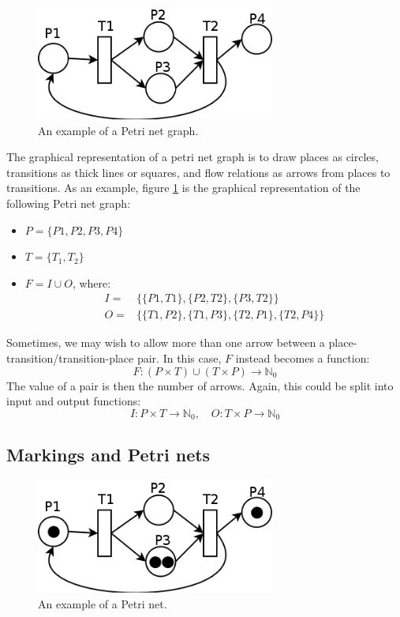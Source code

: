 \documentclass[12pt, a4paper]{article}
\numberwithin{equation}{section}
\begin{document}
\begin{figure}
\centering
\includegraphics[width=0.7\textwidth]{petri_graph}
\caption{An example of a Petri net graph.}
\label{fig:petri_graph}
\end{figure}

The graphical representation of a petri net graph is to draw places as circles, transitions as thick lines or squares, and flow relations as arrows from places to transitions. As an example, figure \ref{fig:petri_graph} is the graphical representation of the following Petri net graph:
\begin{itemize}
\item $P=\{P1, P2, P3, P4\}$
\item $T=\{T_1, T_2\}$
\item $F=I\cup O$, where:
\begin{align}
I=&\{\{P1, T1\}, \{P2, T2\}, \{P3, T2\}\}\\
O=&\{\{T1, P2\}, \{T1, P3\}, \{T2, P1\}, \{T2, P4\}\}
\end{align}
\end{itemize}

Sometimes, we may wish to allow more than one arrow between a place-transition/transition-place pair. In this case, $F$ instead becomes a function:
\begin{equation}
F: (P\times T)\cup(T\times P)\rightarrow\mathbb{N}_0
\end{equation}
The value of a pair is then the number of arrows. Again, this could be split into input and output functions:
\begin{equation}
I: P\times T\rightarrow\mathbb{N}_0,\quad
O: T\times P\rightarrow\mathbb{N}_0
\end{equation}

\subsection{Markings and Petri nets}

\begin{figure}
\centering
\includegraphics[width=0.7\textwidth]{petri_marking}
\caption{An example of a Petri net.}
\label{fig:petri_marking}
\end{figure}
\end{document}
